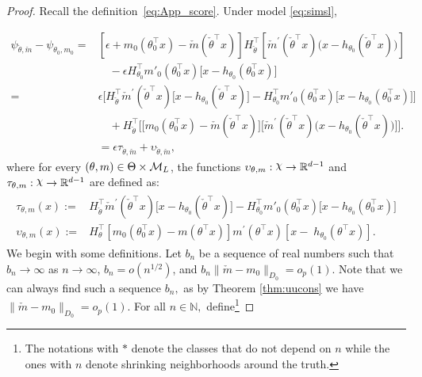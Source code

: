 {\begin{proof}


Recall the definition~\eqref{eq:App_score}. Under model \eqref{eq:simsl},

\begin{align}
\psi_{\check{\theta},\check{m}} -\psi_{\theta_0,m_0}={}& [\epsilon+ m_0(\theta_0^\top x) -\check{m}(\check{\theta}^\top x)] H_{\check\theta}^\top [ \check{m}^\prime (\check{\theta}^\top x) \big(x- h_{\theta_0} (\check{\theta}^\top x)\big)] \\
&\quad- \epsilon H_{\theta_0}^\top m'_0(\theta_0^\top x)\big[ x- h_{\theta_0}(\theta_0^\top x)\big]\\
% 
={}&\epsilon \Big[H_{\check\theta}^\top  \check{m}^\prime (\check{\theta}^\top x) \big[x- h_{\theta_0} (\check{\theta}^\top x)\big] - H_{\theta_0}^\top m'_0(\theta_0^\top x)\big[ x- h_{\theta_0}(\theta_0^\top x)\big]\Big] \\
&\quad +H_{\check\theta}^\top\Big[ \big[m_0(\theta_0^\top x) -\check{m}(\check{\theta}^\top x)\big] \big[ \check{m}^\prime (\check{\theta}^\top x) \big(x- h_{\theta_0} (\check{\theta}^\top x)\big)\big] \Big].\\
% 
&{}=  \epsilon \tau_{\check{\theta},\check{m}} + \upsilon_{\check{\theta},\check{m}}, 
\label{eq:33_11}
\end{align}
where for every $(\theta,m)\in \Theta\times \mathcal{M}_L$, the functions $\upsilon_{\theta, m}:\rchi \rightarrow \R^{d-1}$ and  $ \tau_{\theta, m}:\rchi \rightarrow \R^{d-1}$ are defined as:
\begin{align}\label{eq:G_n_cons_part1}
\begin{split}
 \tau_{\theta, m}(x):={}& H_{\check\theta}^\top  \check{m}^\prime (\check{\theta}^\top x) \big[x- h_{\theta_0} (\check{\theta}^\top x)\big] - H_{\theta_0}^\top m'_0(\theta_0^\top x)\big[ x- h_{\theta_0}(\theta_0^\top x)\big]\\
 \upsilon_{\theta, m}(x):={}& H_\theta^\top  [m_0(\theta_0^\top x) -m(\theta^\top x)]m^\prime (\theta^\top x)  [  x- \;h_{\theta_0} (\theta ^\top x)].
\end{split}
\end{align}
We begin with some definitions.  Let $b_n$ be a sequence of real numbers such that $b_n\rightarrow \infty$ as $n\rightarrow \infty$, $b_n=o(n^{1/2})$,  and $b_n\|\check{m}-m_0\|_{D_{0}} =o_p(1).$ Note that we can always find such a sequence $b_n,$ as by Theorem \ref{thm:uucons} we have $\|\check{m}-m_0\|_{D_{0}} =o_p(1).$ For all $n \in \mathbb{N},$ define\footnote{The notations with $*$ denote the classes that do not depend on $n$ while the ones with $n$ denote shrinking neighborhoods around the truth.}

\end{proof}}
